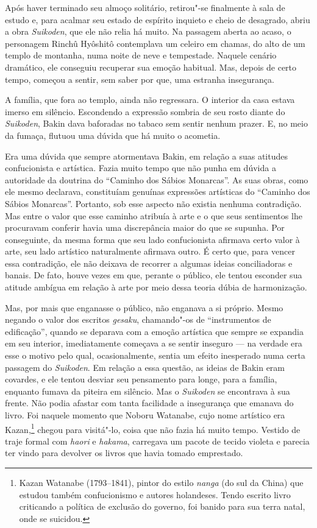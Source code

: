 \sectionitem
Após haver terminado seu almoço solitário, retirou"-se finalmente à sala
de estudo e, para acalmar seu estado de espírito inquieto e cheio de
desagrado, abriu a obra \textit{Suikoden}, que ele não relia há muito.
Na passagem aberta ao acaso, o personagem Rinchû Hyôshitô contemplava
um celeiro em chamas, do alto de um templo de montanha, numa noite de
neve e tempestade. Naquele cenário dramático, ele conseguiu recuperar
sua emoção habitual. Mas, depois de certo tempo, começou a sentir, sem
saber por que, uma estranha insegurança.

A família, que fora ao templo, ainda não regressara. O interior da casa
estava imerso em silêncio. Escondendo a expressão sombria de seu rosto
diante do \textit{Suikoden}, Bakin dava baforadas no tabaco sem sentir
nenhum prazer. E, no meio da fumaça, flutuou uma dúvida que há muito o
acometia.

Era uma dúvida que sempre atormentava Bakin, em relação a suas atitudes
confucionista e artística. Fazia muito tempo que não punha em dúvida a
autoridade da doutrina do ``Caminho dos Sábios Monarcas''. As suas obras,
como ele mesmo declarava, constituíam genuínas expressões artísticas do
``Caminho dos Sábios Monarcas''. Portanto, sob esse aspecto não existia
nenhuma contradição. Mas entre o valor que esse caminho atribuía à arte
e o que seus sentimentos lhe procuravam conferir havia uma discrepância
maior do que se supunha. Por conseguinte, da mesma forma que seu lado
confucionista afirmava certo valor à arte, seu lado artístico
naturalmente afirmava outro. É certo que, para vencer essa contradição,
ele não deixava de recorrer a algumas ideias conciliadoras e banais. De
fato, houve vezes em que, perante o público, ele tentou esconder sua
atitude ambígua em relação à arte por meio dessa teoria dúbia de harmonização.

Mas, por mais que enganasse o público, não enganava a si próprio. Mesmo
negando o valor dos escritos \textit{gesaku}, chamando"-os de
``instrumentos de edificação'', quando se deparava com a emoção artística
que sempre se expandia em seu interior, imediatamente começava a se
sentir inseguro --- na verdade era esse o motivo pelo qual,
ocasionalmente, sentia um efeito inesperado numa certa passagem do
\textit{Suikoden}. Em relação a essa questão, as ideias de Bakin eram
covardes, e ele tentou desviar seu pensamento para longe, para a
família, enquanto fumava da piteira em silêncio. Mas o
\textit{Suikoden} se encontrava à sua frente. Não podia afastar com
tanta facilidade a insegurança que emanava do livro. Foi naquele
momento que Noboru Watanabe, cujo nome artístico era Kazan,\footnote{ Kazan Watanabe 
(1793--1841), pintor do estilo \textit{nanga} (do sul da
China) que estudou também confucionismo e autores holandeses. Tendo
escrito livro criticando a política de exclusão do governo, foi banido
para sua terra natal, onde se suicidou.} chegou para visitá"-lo, coisa
que não fazia há muito tempo. Vestido de traje formal com
\textit{haori} e \textit{hakama}, carregava um pacote de tecido violeta
e parecia ter vindo para devolver os livros que havia tomado emprestado.

